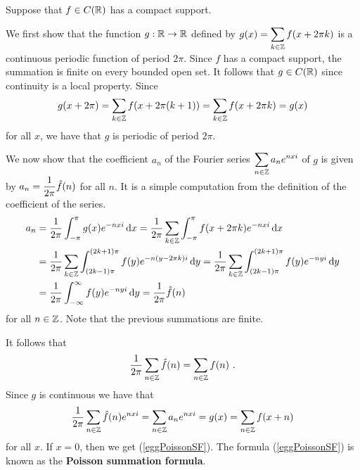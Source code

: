 \begin{egg}
Suppose that $f \in C(\mathbb{R})$ has a compact support.

We first show that the function $\displaystyle g:\mathbb{R} \to \mathbb{R}$ defined by
$\displaystyle g(x) = \sum_{k\in \mathbb{Z}} f(x+ 2 \pi k)$ is a
continuous periodic function of period $2\pi$.  Since $f$ has a
compact support, the summation is finite on every bounded open set.
It follows that $g \in C(\mathbb{R})$ since continuity is a local property.
Since
\[
g(x+2\pi) = \sum_{k\in \mathbb{Z}} f(x+2\pi(k+1))
= \sum_{k\in \mathbb{Z}} f(x+2 \pi k) = g(x)
\]
for all $x$, we have that $g$ is periodic of period $2 \pi$.

We now show that the coefficient $a_n$ of the Fourier series
$\displaystyle \sum_{n\in \mathbb{Z}} a_n e^{n x i}$ of $g$ is given by
$\displaystyle a_n = \frac{1}{2\pi} \hat{f}(n)$ for all $n$.  It is a simple
computation from the definition of the coefficient of the series.
\begin{align*}
a_n &= \frac{1}{2\pi} \int_{-\pi}^{\pi} g(x) e^{- n x i} \,\mathrm{d}{x}
= \frac{1}{2\pi}
\sum_{k\in \mathbb{Z}} \int_{-\pi}^{\pi} f(x+ 2 \pi k) e^{-n x i} \,\mathrm{d}{x} \\
&= \frac{1}{2\pi} 
\sum_{k\in \mathbb{Z}} \int_{(2k-1)\pi}^{(2k+1)\pi} f(y)
e^{-n (y-2 \pi k) i} \,\mathrm{d}{y}
= \frac{1}{2\pi} 
\sum_{k\in \mathbb{Z}} \int_{(2k-1)\pi}^{(2k+1)\pi} f(y) e^{-n y i} \,\mathrm{d}{y} \\
&= \frac{1}{2\pi} \int_{-\infty}^{\infty} f(y) e^{- n y i} \,\mathrm{d}{y}
= \frac{1}{2\pi} \hat{f}(n)
\end{align*}
for all $n \in \mathbb{Z}$.  Note that the previous summations are finite.

It follows that
\begin{equation} \label{eggPoissonSF}
  \frac{1}{2\pi} \sum_{n\in \ZZ} \hat{f}(n) = \sum_{n\in\ZZ} f(n) \ .
\end{equation}
Since $g$ is continuous we have that
\[
\frac{1}{2\pi} \sum_{n\in \mathbb{Z}} \hat{f}(n) e^{n x i}
= \sum_{n\in \mathbb{Z}} a_n e^{n x i} = g(x) =  \sum_{n\in\mathbb{Z}} f(x+n)
\]
for all $x$.  If $x = 0$, then we get (\ref{eggPoissonSF}).  The formula 
(\ref{eggPoissonSF}) is known as the
{\bfseries Poisson summation formula}.
\end{egg}


